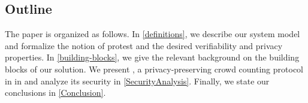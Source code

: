 \subsection{Outline}

The paper is organized as follows.
In \cref{definitions}, we describe our system model and formalize the notion of 
protest and the desired verifiability and privacy properties.
In \cref{building-blocks}, we give the relevant background on the building 
blocks of our solution.
%
%
We present \CROCUS, a privacy-preserving crowd counting 
protocol in in  and analyze its security in
\cref{SecurityAnalysis}.
Finally, we state
our conclusions in \cref{Conclusion}.
